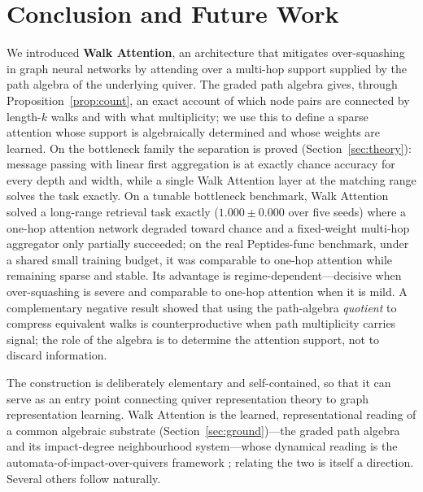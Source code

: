 \section{Conclusion and Future Work}\label{sec:conclusion}

We introduced \textbf{Walk Attention}, an architecture that mitigates
over-squashing in graph neural networks by attending over a multi-hop support
supplied by the path algebra of the underlying quiver. The graded path algebra
gives, through Proposition~\ref{prop:count}, an exact account of which node pairs
are connected by length-$k$ walks and with what multiplicity; we use this to
define a sparse attention whose support is algebraically determined and whose
weights are learned. On the bottleneck family the separation is proved
(Section~\ref{sec:theory}): message passing with linear first aggregation is at
exactly chance accuracy for every depth and width, while a single Walk
Attention layer at the matching range solves the task exactly. On a tunable
bottleneck benchmark, Walk Attention solved a
long-range retrieval task exactly ($1.000\pm0.000$ over five seeds) where a
one-hop attention network degraded toward chance and a fixed-weight multi-hop
aggregator only partially succeeded; on the real Peptides-func benchmark, under
a shared small training budget, it was comparable to one-hop attention while
remaining sparse and stable. Its
advantage is regime-dependent---decisive when over-squashing is severe and
comparable to one-hop attention when it is mild. A complementary negative result
showed that using the path-algebra \emph{quotient} to compress equivalent walks
is counterproductive when path multiplicity carries signal; the role of the
algebra is to determine the attention support, not to discard information.

The construction is deliberately elementary and self-contained, so that it can
serve as an entry point connecting quiver representation theory to graph
representation learning. Walk Attention is the learned, representational reading
of a common algebraic substrate (Section~\ref{sec:ground})---the graded path
algebra and its impact-degree neighbourhood system---whose dynamical reading is
the automata-of-impact-over-quivers framework \cite{zainea2026aiq}; relating the
two is itself a direction. Several others follow naturally.

